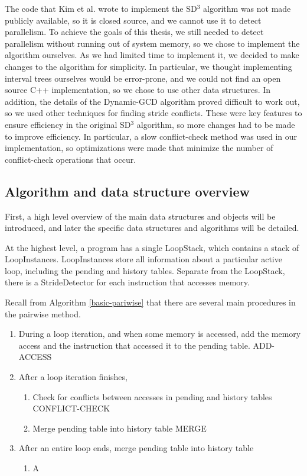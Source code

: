 \documentclass[12pt,twoside]{reedthesis}
\begin{document}
		The code that Kim et al. wrote to implement the SD$^3$ algorithm was not made publicly available, so it is closed source, and we cannot use it to detect parallelism. To achieve the goals of this thesis, we still needed to detect parallelism without running out of system memory, so we chose to implement the algorithm ourselves. As we had limited time to implement it, we decided to make changes to the algorithm for simplicity. In particular, we thought implementing interval trees ourselves would be error-prone, and we could not find an open source C++ implementation, so we chose to use other data structures. 
		In addition, the details of the Dynamic-GCD algorithm proved difficult to work out, so we used other techniques for finding stride conflicts.
		These were key features to ensure efficiency in the original SD$^3$ algorithm, so more changes had to be made to improve efficiency. In particular, a slow conflict-check method was used in our implementation, so optimizations were made that minimize the number of conflict-check operations that occur. 
		
		\subsection{Algorithm and data structure overview}
		
			
			First, a high level overview of the main data structures and objects will be introduced, and later the specific data structures and algorithms will be detailed. 
			
			At the highest level, a program has a single LoopStack, which contains a stack of LoopInstances. LoopInstances store all information about a particular active loop, including the pending and history tables.	Separate from the LoopStack, there is a StrideDetector for each instruction that accesses memory. 
			
			Recall from Algorithm \ref{basic-pariwise} that there are several main procedures in the pairwise method. 
			
			\begin{enumerate}
				\item During a loop iteration, and when some memory is accessed, add the memory access and the instruction that accessed it to the pending table. ADD-ACCESS
				\item After a loop iteration finishes,
				\begin{enumerate}
					\item Check for conflicts between accesses in pending and history tables CONFLICT-CHECK
					\item Merge pending table into history table MERGE
				\end{enumerate}
				\item After an entire loop ends, merge pending table into history table 
				\begin{enumerate}
					\item A
				\end{enumerate}
			\end{enumerate}
			
\end{document}
